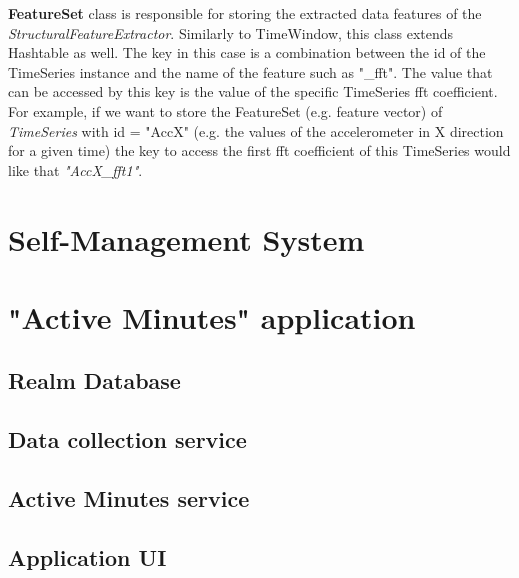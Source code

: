     \textbf{FeatureSet} class is responsible for storing the extracted data features of the \textit{StructuralFeatureExtractor}. Similarly to TimeWindow, this class extends Hashtable as well. The key in this case is a combination between the id of the TimeSeries instance and the name of the feature such as "\_fft". The value that can be accessed by this key is the value of the specific TimeSeries \gls{fft} coefficient. For example, if we want to store the FeatureSet (e.g. feature vector) of \textit{TimeSeries} with id = "AccX" (e.g. the values of the accelerometer in X direction for a given time) the key to access the first \gls{fft} coefficient of this TimeSeries would like that \textit{"AccX\_fft1"}.
        
        
\section{Self-Management System}

\section{"Active Minutes" application}   
    
    \subsection{Realm Database}
    
    \subsection{Data collection service}
    
    \subsection{Active Minutes service}
    
    \subsection{Application UI}  




    
    
    
    